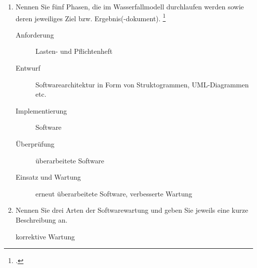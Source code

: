 \documentclass{bschlangaul-aufgabe}
\begin{document}

\begin{enumerate}


\item Nennen Sie fünf Phasen, die im Wasserfallmodell durchlaufen werden
sowie deren jeweiliges Ziel bzw.
Ergebnis(-dokument).
\footcite{examen:66116:2020:09}

\begin{bAntwort}
\begin{description}
\item[Anforderung]

Lasten- und Pflichtenheft

\item[Entwurf]

Softwarearchitektur in Form von Struktogrammen, UML-Diagrammen etc.

\item[Implementierung]

Software

\item[Überprüfung]

überarbeitete Software

\item[Einsatz und Wartung]

erneut überarbeitete Software, verbesserte Wartung
\end{description}
\end{bAntwort}


\item Nennen Sie drei Arten der Softwarewartung und geben Sie jeweils
eine kurze Beschreibung an.

\begin{bAntwort}
\begin{description}
\item[korrektive Wartung]


\end{description}
\end{bAntwort}
\end{enumerate}
\end{document}
